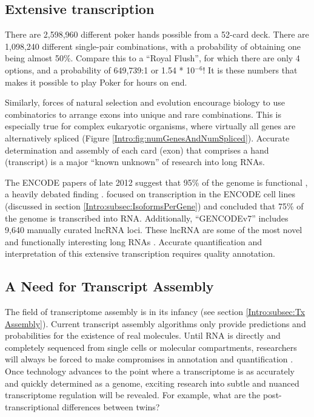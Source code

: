   \subsection{Extensive transcription}
    \label{Disc:subsec:Pervasive Tx}

    There are 2,598,960 different poker hands possible from a 52-card deck. There are 1,098,240 different single-pair combinations, with a probability of obtaining one being almost 50\%. Compare this to a ``Royal Flush'', for which there are only 4 options, and a probability of 649,739:1 or 1.54 * 10$^{-6}$! It is these numbers that makes it possible to play Poker for hours on end. 

    Similarly, forces of natural selection and evolution encourage biology to use combinatorics to arrange exons into unique and rare combinations. This is especially true for complex eukaryotic organisms, where virtually all genes are alternatively spliced (Figure \ref{Intro:fig:numGenesAndNumSpliced}). Accurate determination and assembly of each card (exon) that comprises a hand (transcript) is a major ``known unknown'' \citep{Rumsfeld2011} of research into long RNAs.

    The ENCODE papers of late 2012 suggest that 95\% of the genome is functional \citep{Dunham2012}, a heavily debated finding \citep{Graur2013,Bhattacharjee2014}. \citet{Djebali2012} focused on transcription in the ENCODE cell lines (discussed in section \ref{Intro:subsec:IsoformsPerGene}) and concluded that 75\% of the genome is transcribed into RNA. Additionally, ``GENCODEv7'' includes 9,640 manually curated lncRNA loci. These lncRNA are some of the most novel and functionally interesting long RNAs \citep{Derrien2012,Pauli2011}. Accurate quantification and interpretation of this extensive transcription requires quality annotation.

  \subsection{A Need for Transcript Assembly}
    \label{Disc:subsec:need for Tx assembly}

    The field of transcriptome assembly is in its infancy (see section \ref{Intro:subsec:Tx Assembly}). Current transcript assembly algorithms only provide predictions and probabilities for the existence of real molecules. Until RNA is directly and completely sequenced from single cells or molecular compartments, researchers will always be forced to make compromises in annotation and quantification \citep{Ozsolak2010,Steijger2013}. Once technology advances to the point where a transcriptome is as accurately and quickly determined as a genome, exciting research into subtle and nuanced transcriptome regulation will be revealed. For example, what are the post-transcriptional differences between twins?

